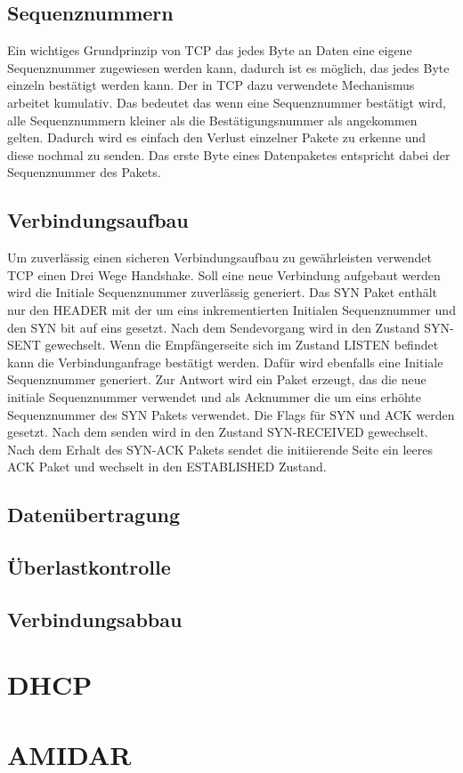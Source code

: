 \subsection{Sequenznummern}
Ein wichtiges Grundprinzip von TCP das jedes Byte an Daten eine eigene Sequenznummer zugewiesen werden kann, dadurch ist es möglich, das jedes Byte einzeln bestätigt werden kann. Der in TCP dazu verwendete Mechanismus arbeitet kumulativ. Das bedeutet das wenn eine Sequenznummer bestätigt wird, alle Sequenznummern kleiner als die Bestätigungsnummer als angekommen gelten. Dadurch wird es einfach den Verlust einzelner Pakete zu erkenne und diese nochmal zu senden. Das erste Byte eines Datenpaketes entspricht dabei der Sequenznummer des Pakets. 

\subsection{Verbindungsaufbau}
Um zuverlässig einen sicheren Verbindungsaufbau zu gewährleisten verwendet TCP einen Drei Wege Handshake. Soll eine neue Verbindung aufgebaut werden wird die Initiale Sequenznummer zuverlässig generiert. Das SYN Paket enthält nur den HEADER mit der um eins inkrementierten Initialen Sequenznummer und den SYN bit auf eins gesetzt. Nach dem Sendevorgang wird in den Zustand SYN-SENT gewechselt. Wenn die Empfängerseite sich im Zustand LISTEN befindet kann die Verbindunganfrage bestätigt werden. Dafür wird ebenfalls eine Initiale Sequenznummer generiert. Zur Antwort wird ein Paket erzeugt, das die neue initiale Sequenznummer verwendet und als Acknummer die um eins erhöhte Sequenznummer des SYN Pakets verwendet. Die Flags für SYN und ACK werden gesetzt. Nach dem senden wird in den Zustand SYN-RECEIVED gewechselt.\\
Nach dem Erhalt des SYN-ACK Pakets sendet die initiierende Seite ein leeres ACK Paket und wechselt in den ESTABLISHED Zustand. 
\subsection{Datenübertragung}

\subsection{Überlastkontrolle}

\subsection{Verbindungsabbau}

\section{DHCP}
\section{AMIDAR}